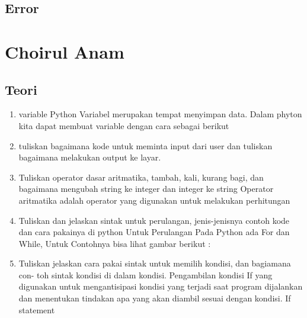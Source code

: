 \subsection{Error}
    


\section{Choirul Anam}
\subsection{Teori}
\begin{enumerate}
    \item variable Python
    Variabel merupakan tempat menyimpan data. Dalam phyton kita dapat membuat variable dengan cara sebagai berikut
    

    \item tuliskan bagaimana kode untuk meminta input dari user dan tuliskan bagaimana
    melakukan output ke layar.
    
    

    \item Tuliskan operator dasar aritmatika, tambah, kali, kurang bagi, dan bagaimana
    mengubah string ke integer dan integer ke string
    Operator  aritmatika adalah operator yang digunakan untuk melakukan perhitungan
    
  

    \item Tuliskan dan jelaskan sintak untuk perulangan, jenis-jenisnya contoh kode dan
    cara pakainya di python
    Untuk Perulangan Pada Python ada For dan While, Untuk Contohnya bisa lihat gambar berikut :
    

    \item Tuliskan jelaskan cara pakai sintak untuk memilih kondisi, dan bagiamana con-
    toh sintak kondisi di dalam kondisi.
    Pengambilan kondisi If yang digunakan untuk mengantisipasi kondisi yang terjadi saat program dijalankan dan menentukan tindakan apa yang akan diambil sesuai dengan kondisi.
    If statement
    


\end{enumerate}
